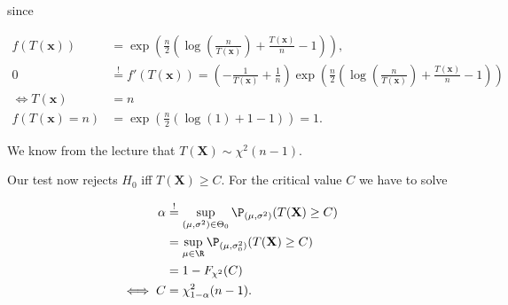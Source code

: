 \begin{solution}
since

\begin{align*}
  f(T(\textbf{x})) &= \exp\left(\frac{n}{2}\left( \log\left(\frac{n}{T(\textbf{x})}\right) +  \frac{T(\textbf{x})}{n} - 1\right)\right), \\
  0 &\stackrel{!}{=} f'(T(\textbf{x})) 
  = \left(-\frac{1}{T(\textbf{x})} + \frac{1}{n}\right)
  \exp\left(\frac{n}{2}\left( \log\left(\frac{n}{T(\textbf{x})}\right) +  
  \frac{T(\textbf{x})}{n} - 1\right)\right) \\
  \iff T(\textbf{x}) &= n \\
  f(T(\textbf{x}) = n) &= \exp\left(\frac{n}{2}\left( \log(1) +  1 - 1\right)\right) = 1.
\end{align*}

We know from the lecture that $T(\textbf{X}) \sim  \chi^2(n-1)$.

Our test now rejects $H_0$ iff $T(\textbf{X}) \geq C$.
For the critical value $C$ we have to solve

\begin{align*}
  \alpha &\stackrel{!}{=} \sup_{(\mu, \sigma^2) \in \Theta_0} \P_{(\mu, \sigma^2)}(T(\textbf{X}) \geq C) \\
  &= \sup_{\mu \in \R} \P_{(\mu, \sigma_0^2)}(T(\textbf{X}) \geq C) \\
  &= 1 - F_{\chi^2}(C) \\
  \iff C &= \chi_{1 - \alpha}^2(n-1).
\end{align*}
\end{solution}

